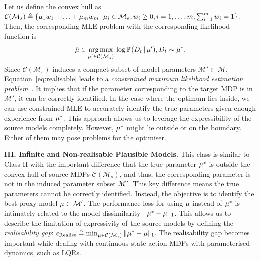 Let us define the convex hull as $\mathcal{C}(\mathcal{M}_s) \triangleq \{\mu_1 w_1 + \hdots + \mu_m w_m \, | \, \mu_i \in \mathcal{M}_s, w_i \geq 0, i=1, \hdots, m, \sum_{i=1}^m w_i = 1\}$. Then, the corresponding MLE problem with the corresponding likelihood function is %
\begin{equation}\label{eq:realisable}
    \hat{\mu} \in \underset{\mu' \in \mathcal{C}(\mathcal{M}_s)}{\arg\max} \, \log \mathbb{P}(D_t \, | \, \mu'), D_t \sim \mu^{*}.
\end{equation}
Since $\mathcal{C}(\mathcal{M}_s)$ induces a compact subset of model parameters $\mathcal{M}' \subset \mathcal{M}$, Equation~\eqref{eq:realisable} leads to a \emph{constrained maximum likelihood estimation problem}~\citep{aitchison1958maximum}. It implies that if the parameter corresponding to the target MDP is in $\mathcal{M}'$, it can be correctly identified. In the case where the optimum lies inside, we can use constrained MLE to accurately identify the true parameters given enough experience from $\mu^{*}$. This approach allows us to leverage the expressibility of the source models completely. However, $\mu^{*}$ might lie outside or on the boundary. Either of them may pose problems for the optimiser.

\textbf{III. Infinite and Non-realisable Plausible Models.}\label{subsec:non-realisable}
This class is similar to Class II with the important difference that the true parameter $\mu^*$ is outside the convex hull of source MDPs $\mathcal{C}(\mathcal{M}_s)$, and thus, the corresponding parameter is not in the induced parameter subset $\mathcal{M}'$. This key difference means the true parameters cannot be correctly identified. 
Instead, the objective is to identify the best proxy model $\mu \in \mathcal{M}'$. The performance loss for using $\mu$ instead of $\mu^{*}$ is intimately related to the model dissimilarity $||\mu^{*}-\mu||_1$. This allows us to describe the limitation of expressivity of the source models by defining the \textit{realisability gap}: $\epsilon_{\mathrm{Realise}} \triangleq \min_{\mu \in \mathcal{C}(\mathcal{M}_s)}\|\mu^{*}-\mu\|_1 $. The realisability gap becomes important while dealing with continuous state-action MDPs with parameterised dynamics, such as LQRs. %

